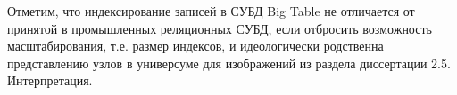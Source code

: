 Отметим, что индексирование записей в  СУБД  Big Table  не отличается от принятой в промышленных реляционных СУБД, если отбросить возможность масштабирования, т.е. размер индексов, и идеологически родственна представлению узлов в универсуме для изображений из раздела диссертации 2.5. Интерпретация. 

%
%


